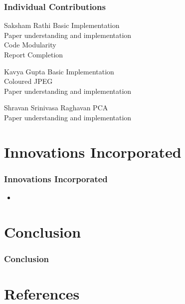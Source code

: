 \documentclass[Serif, 10pt, brown]{beamer}
\theoremstyle{example}
\theoremstyle{plain}
\begin{document}
\begin{frame}
	\frametitle{Individual Contributions}
	\begin{alertblock}{Saksham Rathi}
		Basic Implementation\\
		Paper understanding and implementation\\
		Code Modularity\\
		Report Completion
	\end{alertblock}
	\begin{alertblock}{Kavya Gupta}
		Basic Implementation\\
		Coloured JPEG\\
		Paper understanding and implementation
	\end{alertblock}
	\begin{alertblock}{Shravan Srinivasa Raghavan}
		PCA\\
		Paper understanding and implementation
	\end{alertblock}

\end{frame}

\section{Innovations Incorporated}

\begin{frame}
	\frametitle{Innovations Incorporated}
	\begin{itemize}
		\item 
	\end{itemize}
\end{frame}
\section{Conclusion}
\begin{frame}
	\frametitle{Conclusion}
\end{frame}

\section{References}
\end{document}
